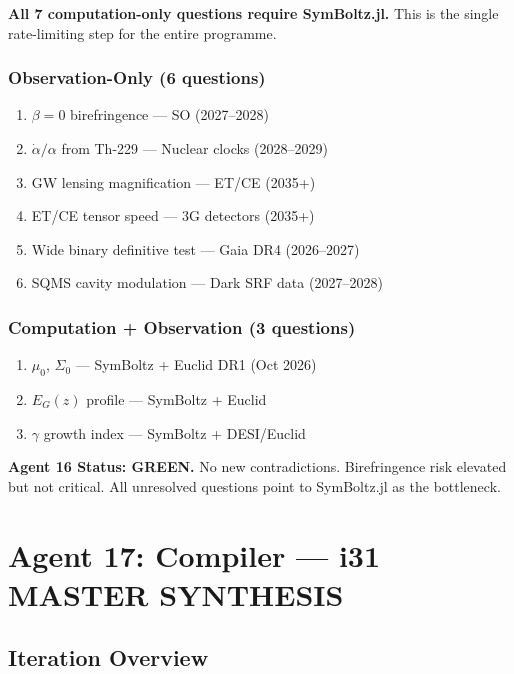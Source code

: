 \documentclass[11pt,a4paper]{article}
\newcommand{\GREEN}{\textcolor{dfdgreen}{\textbf{GREEN}}}
\begin{document}
\textbf{All 7 computation-only questions require SymBoltz.jl.} This is the single rate-limiting step for the entire programme.

\subsubsection{Observation-Only (6 questions)}
\begin{enumerate}
\item $\beta = 0$ birefringence --- SO (2027--2028)
\item $\dot\alpha/\alpha$ from Th-229 --- Nuclear clocks (2028--2029)
\item GW lensing magnification --- ET/CE (2035+)
\item ET/CE tensor speed --- 3G detectors (2035+)
\item Wide binary definitive test --- Gaia DR4 (2026--2027)
\item SQMS cavity modulation --- Dark SRF data (2027--2028)
\end{enumerate}

\subsubsection{Computation + Observation (3 questions)}
\begin{enumerate}
\item $\mu_0$, $\Sigma_0$ --- SymBoltz + Euclid DR1 (Oct 2026)
\item $E_G(z)$ profile --- SymBoltz + Euclid
\item $\gamma$ growth index --- SymBoltz + DESI/Euclid
\end{enumerate}

\textbf{Agent 16 Status: \GREEN.} No new contradictions. Birefringence risk elevated but not critical. All unresolved questions point to SymBoltz.jl as the bottleneck.

\section{Agent 17: Compiler --- i31 MASTER SYNTHESIS}

\subsection{Iteration Overview}
\end{document}
